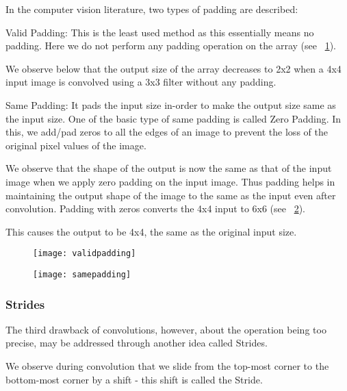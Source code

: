 In the computer vision literature, two types of padding are described:
	\begin{bulletedlist}
		\item Valid Padding: This is the least used method as this essentially means no padding.  Here we do not perform any padding operation on the array (see \figurename~\ref{fig:validpadding}).
		\begin{bulletedlist}
			\item We observe below that the output size of the array decreases to 2x2 when a 4x4 input image is convolved using a 3x3 filter without any padding.
		\end{bulletedlist}
		\item Same Padding: It pads the input size in-order to make the output size same as the input size.  One of the basic type of same padding is called Zero Padding. In this, we add/pad zeros to all the edges of an image to prevent the loss of the original pixel values of the image.
		\begin{bulletedlist}
			\item We observe that the shape of the output is now the same as that of the input image when we apply zero padding on the input image. Thus padding helps in maintaining the output shape of the image to the same as the input even after convolution.
Padding with zeros converts the 4x4 input to 6x6 (see \figurename~\ref{fig:samepadding}).
			\item This causes the output to be 4x4, the same as the original input size.
		\end{bulletedlist}
	\end{bulletedlist}


	\begin{figure}[h]
		\centering
		\texttt{[image: validpadding]}
		\caption{}
		\label{fig:validpadding}
	\end{figure}

	\begin{figure}[h]
		\centering
		\texttt{[image: samepadding]}
		\caption{}
		\label{fig:samepadding}
	\end{figure}


	\subsubsection{Strides}

	\begin{bulletedlist}
		\item The third drawback of convolutions, however, about the operation being too precise, may be addressed through another idea called Strides.
		\item We observe during convolution that we slide from the top-most corner to the bottom-most corner by a shift - this shift is called the Stride.
	\end{bulletedlist}

